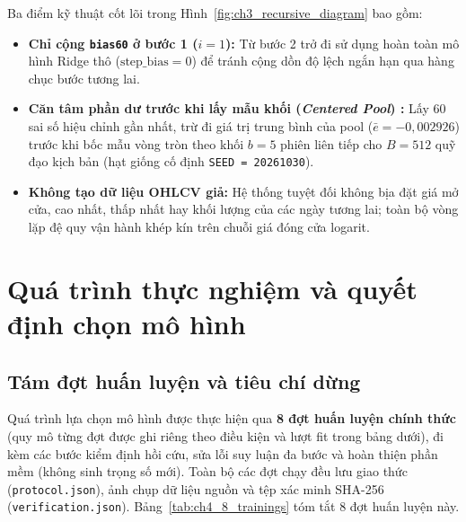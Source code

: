 \documentclass[12pt,a4paper]{report}
\begin{document}
Ba điểm kỹ thuật cốt lõi trong Hình~\ref{fig:ch3_recursive_diagram} bao gồm:
\begin{itemize}
    \item \textbf{Chỉ cộng \texttt{bias60} ở bước 1 ($i=1$):} Từ bước 2 trở đi sử dụng hoàn toàn mô hình Ridge thô ($\text{step\_bias} = 0$) để tránh cộng dồn độ lệch ngắn hạn qua hàng chục bước tương lai.
    \item \textbf{Căn tâm phần dư trước khi lấy mẫu khối (\textit{Centered Pool}) \cite{politis1992circular,kreiss2012bootstrap}:} Lấy 60 sai số hiệu chỉnh gần nhất, trừ đi giá trị trung bình của pool ($\bar{e} = -0,002926$) trước khi bốc mẫu vòng tròn theo khối $b = 5$ phiên liên tiếp cho $B = 512$ quỹ đạo kịch bản (hạt giống cố định \texttt{SEED = 20261030}).
    \item \textbf{Không tạo dữ liệu OHLCV giả:} Hệ thống tuyệt đối không bịa đặt giá mở cửa, cao nhất, thấp nhất hay khối lượng của các ngày tương lai; toàn bộ vòng lặp đệ quy vận hành khép kín trên chuỗi giá đóng cửa logarit.
\end{itemize}

\clearpage
\chapter{Quá trình thực nghiệm và quyết định chọn mô hình}

\section{Tám đợt huấn luyện và tiêu chí dừng}
Quá trình lựa chọn mô hình được thực hiện qua \textbf{8 đợt huấn luyện chính thức} (quy mô từng đợt được ghi riêng theo điều kiện và lượt fit trong bảng dưới), đi kèm các bước kiểm định hồi cứu, sửa lỗi suy luận đa bước và hoàn thiện phần mềm (không sinh trọng số mới). Toàn bộ các đợt chạy đều lưu giao thức (\nolinkurl{protocol.json}), ảnh chụp dữ liệu nguồn và tệp xác minh SHA-256 (\nolinkurl{verification.json}). Bảng~\ref{tab:ch4_8_trainings} tóm tắt 8 đợt huấn luyện này.
\end{document}
